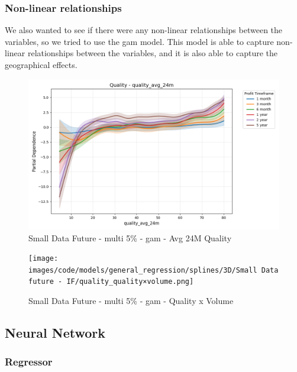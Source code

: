 \documentclass[11pt,english,a4paper,hidelinks]{book}
\begin{document}
\subsubsection{Non-linear relationships}

\noindent We also wanted to see if there were any non-linear relationships between the variables, so we tried to use the \acrshort{gam} model. This model is able to capture non-linear relationships between the variables, and it is also able to capture the geographical effects.

\begin{figure}[H]
    \centering
    \includegraphics[width=1\textwidth]{images/code/models/general_regression/splines/2D/Small Data future - IF/quality_quality_avg_24m.png}
    \caption{Small Data Future - \acrshort{multi} 5\% - \acrshort{gam} - Avg 24M Quality}
    \label{fig:gam_quality_quality_avg_24m}
\end{figure}

\begin{figure}[H]
    \centering
    \texttt{[image: images/code/models/general\_regression/splines/3D/Small Data future - IF/quality\_quality×volume.png]}
    \caption{Small Data Future - \acrshort{multi} 5\% - \acrshort{gam} - Quality x Volume}
    \label{fig:gam_quality_volume}
\end{figure}



\subsection{Neural Network}

\subsubsection{Regressor}
\end{document}
